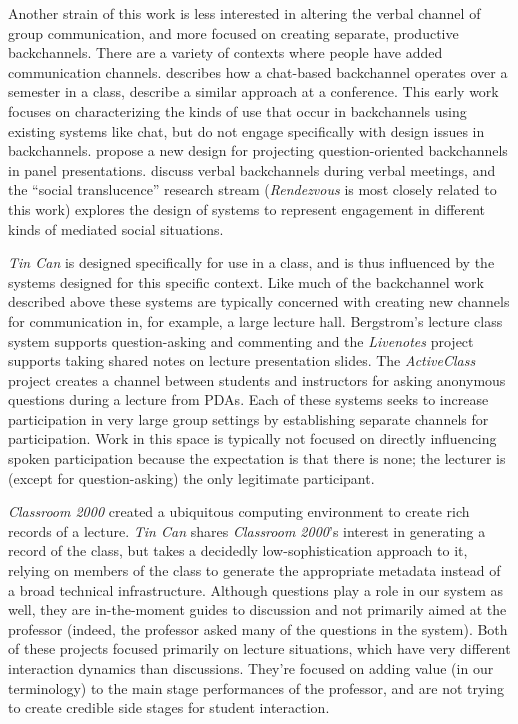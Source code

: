 Another strain of this work is less interested in altering the verbal channel of group communication, and more focused on creating separate, productive  backchannels. There are a variety of contexts where people have added communication channels. \citet{Yardi:2006uk} describes how a chat-based backchannel operates over a semester in a class, \citet{mccarthy_digital_2004} describe a similar approach at a conference. This early work focuses on characterizing the kinds of use that occur in backchannels using existing systems like chat, but do not engage specifically with design issues in backchannels. \citet{Harry:2009jh} propose a new design for projecting question-oriented backchannels in panel presentations.  \citet{Yankelovich:2005bx} discuss verbal backchannels during verbal meetings, and the ``social translucence'' research stream (\emph{Rendezvous} \citep{kellogg_leveraging_2006} is most closely related to this work) explores the design of systems to represent engagement in different kinds of mediated social situations.

\emph{Tin Can} is designed specifically for use in a class, and is thus influenced by the systems designed for this specific context. Like much of the backchannel work described above these systems are typically concerned with creating new channels for communication in, for example, a large lecture hall. Bergstrom's lecture class system \citep{Bergstrom:wl} supports question-asking and commenting and the \emph{Livenotes} project \citep{Kam:2005wb} supports taking shared notes on lecture presentation slides. The \emph{ActiveClass} project \citep{Ratto:2003vs} creates a channel between students and instructors for asking anonymous questions during a lecture from PDAs.  Each of these systems seeks to increase participation in very large group settings by establishing separate channels for participation.  Work in this space is typically not focused on directly influencing spoken participation because the expectation is that there is none; the lecturer is (except for question-asking) the only legitimate participant.

\emph{Classroom 2000} \citep{Abowd:1998wp} created a ubiquitous computing environment to create rich records of a lecture. \emph{Tin Can} shares \emph{Classroom 2000}'s interest in generating a record of the class, but takes a decidedly low-sophistication approach to it, relying on members of the class to generate the appropriate metadata instead of a broad technical infrastructure. Although questions play a role in our system as well, they are in-the-moment guides to discussion and not primarily aimed at the professor (indeed, the professor asked many of the questions in the system). Both of these projects focused primarily on lecture situations, which have very different interaction dynamics than discussions. They're focused on adding value (in our terminology) to the main stage performances of the professor, and are not trying to create credible side stages for student interaction.


